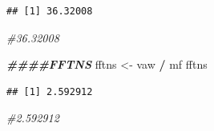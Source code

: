 \documentclass[
]{article}
\newenvironment{Shaded}{\begin{snugshade}}{\end{snugshade}}
\newcommand{\CommentTok}[1]{\textcolor[rgb]{0.56,0.35,0.01}{\textit{#1}}}
\newcommand{\DocumentationTok}[1]{\textcolor[rgb]{0.56,0.35,0.01}{\textbf{\textit{#1}}}}
\newcommand{\NormalTok}[1]{#1}
\newcommand{\OtherTok}[1]{\textcolor[rgb]{0.56,0.35,0.01}{#1}}
\newcommand{\SpecialCharTok}[1]{\textcolor[rgb]{0.81,0.36,0.00}{\textbf{#1}}}
\begin{document}
\begin{verbatim}
## [1] 36.32008
\end{verbatim}

\begin{Shaded}
\begin{Highlighting}[]
\CommentTok{\#36.32008}

\DocumentationTok{\#\#\#\#FFTNS}
\NormalTok{fftns }\OtherTok{\textless{}{-}}\NormalTok{ vaw }\SpecialCharTok{/}\NormalTok{ mf}
\NormalTok{fftns}
\end{Highlighting}
\end{Shaded}

\begin{verbatim}
## [1] 2.592912
\end{verbatim}

\begin{Shaded}
\begin{Highlighting}[]
\CommentTok{\#2.592912}


\end{Highlighting}
\end{Shaded}
\end{document}
